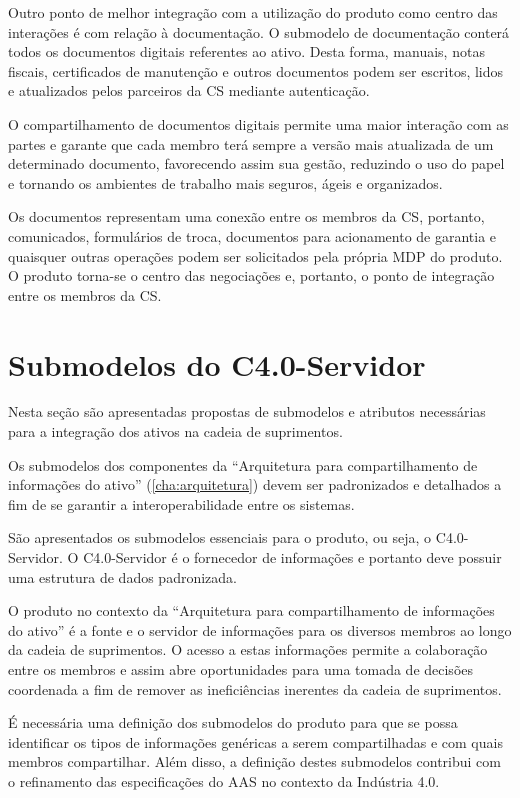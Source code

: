 Outro ponto de melhor integração com a utilização do produto como centro das interações é com relação à documentação. O submodelo de documentação conterá todos os documentos digitais referentes ao ativo. Desta forma, manuais, notas fiscais, certificados de manutenção e outros documentos podem ser escritos, lidos e atualizados pelos parceiros da CS mediante autenticação.

O compartilhamento de documentos digitais permite uma maior interação com as partes e garante que cada membro terá sempre a versão mais atualizada de um determinado documento, favorecendo assim sua gestão, reduzindo o uso do papel e tornando os ambientes de trabalho mais seguros, ágeis e organizados.

Os documentos representam uma conexão entre os membros da CS, portanto, comunicados, formulários de troca, documentos para acionamento de garantia e quaisquer outras operações podem ser solicitados pela própria MDP do produto. O produto torna-se o centro das negociações e, portanto, o ponto de integração entre os membros da CS.

\section{Submodelos do C4.0-Servidor}

Nesta seção são apresentadas propostas de submodelos e atributos necessárias para a integração dos ativos na cadeia de suprimentos.

Os submodelos dos componentes da ``Arquitetura para compartilhamento de informações do ativo'' (\autoref{cha:arquitetura}) devem ser padronizados e detalhados a fim de se garantir a interoperabilidade entre os sistemas.

São apresentados os submodelos essenciais para o produto, ou seja, o C4.0-Servidor. O C4.0-Servidor é o fornecedor de informações e portanto deve possuir uma estrutura de dados padronizada.

O produto no contexto da ``Arquitetura para compartilhamento de informações do ativo'' é a fonte e o servidor de informações para os diversos membros ao longo da cadeia de suprimentos. O acesso a estas informações permite a colaboração entre os membros e assim abre oportunidades para uma tomada de decisões coordenada a fim de remover as ineficiências inerentes da cadeia de suprimentos.

É necessária uma definição dos submodelos do produto para que se possa identificar os tipos de informações genéricas a serem compartilhadas e com quais membros compartilhar. Além disso, a definição destes submodelos contribui com o refinamento das especificações do AAS no contexto da Indústria 4.0.

